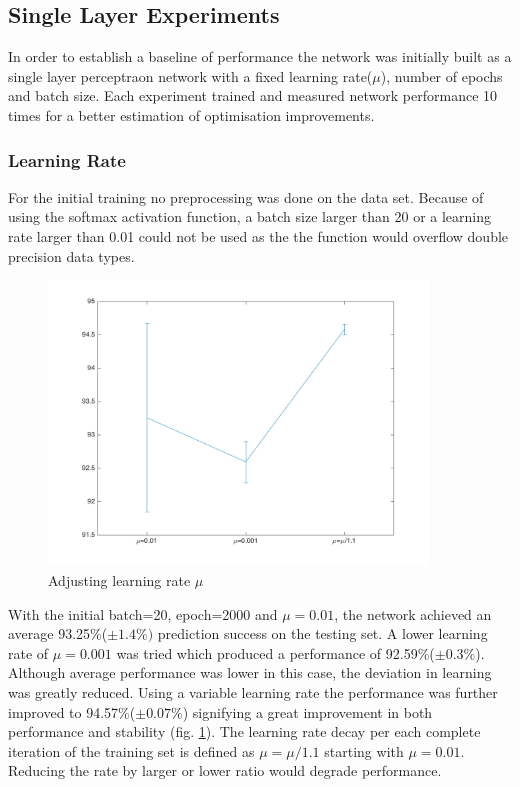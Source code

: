 \documentclass[11]{article}
\begin{document}
\subsection{Single Layer Experiments}
In order to establish a baseline of performance the network was initially built as a single layer perceptraon network with a fixed learning rate($\mu$), number of epochs and batch size. Each experiment trained and measured network performance 10 times for a better estimation of optimisation improvements. 

\subsubsection{Learning Rate}

For the initial training no preprocessing was done on the data set. Because of using the softmax activation function, a batch size larger than 20 or a learning rate larger than 0.01 could not be used as the the function would overflow double precision data types.

\begin{figure}
\centering
\includegraphics[width=0.9\textwidth]{learning_rate.png}
\caption{Adjusting learning rate $\mu$}
\label{fig:learningrate}
\end{figure}

With the initial batch=20, epoch=2000 and $\mu=0.01$, the network achieved an average 93.25\%($\pm 1.4\%)$ prediction success on the testing set.  A lower learning rate of $\mu=0.001$ was tried which produced a performance of 92.59\%($\pm 0.3\%$). Although average performance was lower in this case, the deviation in learning was greatly reduced. Using a variable learning rate the performance was further improved to 94.57\%($\pm 0.07\%$) signifying a great improvement in both performance and stability (fig. \ref{fig:learningrate}). The learning rate decay per each complete iteration of the training set is defined as $\mu = \mu / 1.1$ starting with $\mu=0.01$. Reducing the rate by larger or lower ratio would degrade performance. 
\end{document}
